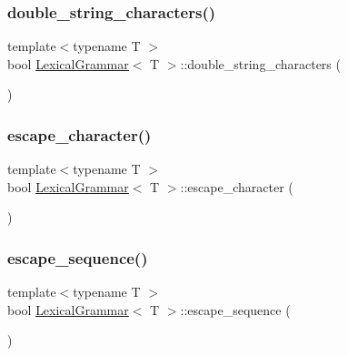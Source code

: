 \mbox{\label{class_lexical_grammar_aab6bf886c515b469bfd7bf034148c9ee}} 
\subsubsection{\texorpdfstring{double\+\_\+string\+\_\+characters()}{double\_string\_characters()}}
{\footnotesize\ttfamily template$<$typename T $>$ \\
bool \hyperlink{class_lexical_grammar}{Lexical\+Grammar}$<$ T $>$\+::double\+\_\+string\+\_\+characters (\begin{DoxyParamCaption}{ }\end{DoxyParamCaption})\hspace{0.3cm}{\ttfamily [inline]}}

\mbox{\label{class_lexical_grammar_a5f2624873c3468c05a40c2e186253eec}} 
\subsubsection{\texorpdfstring{escape\+\_\+character()}{escape\_character()}}
{\footnotesize\ttfamily template$<$typename T $>$ \\
bool \hyperlink{class_lexical_grammar}{Lexical\+Grammar}$<$ T $>$\+::escape\+\_\+character (\begin{DoxyParamCaption}{ }\end{DoxyParamCaption})\hspace{0.3cm}{\ttfamily [inline]}}

\mbox{\label{class_lexical_grammar_aba86d71a98d0bf2f7ad78e22b1c906f0}} 
\subsubsection{\texorpdfstring{escape\+\_\+sequence()}{escape\_sequence()}}
{\footnotesize\ttfamily template$<$typename T $>$ \\
bool \hyperlink{class_lexical_grammar}{Lexical\+Grammar}$<$ T $>$\+::escape\+\_\+sequence (\begin{DoxyParamCaption}{ }\end{DoxyParamCaption})\hspace{0.3cm}{\ttfamily [inline]}}

